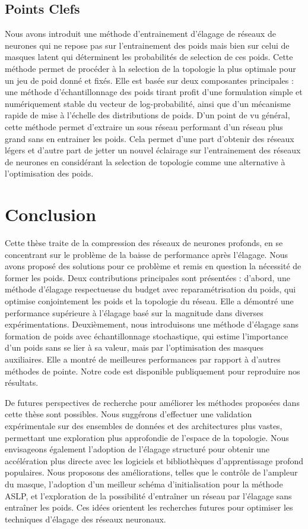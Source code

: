 \subsection*{Points Clefs}

Nous avons introduit une méthode d'entrainement d'élagage de réseaux de neurones
qui ne repose pas sur l'entrainement des poids mais bien sur celui de masques
latent qui déterminent les probabilités de selection de ces poids. Cette méthode
permet de procéder à la selection de la topologie la plus optimale pour un jeu
de poid donné et fixés. Elle est basée sur deux composantes principales : une
méthode d'échantillonnage des poids tirant profit d'une formulation simple et
numériquement stable du vecteur de log-probabilité, ainsi que d'un mécanisme
rapide de mise à l'échelle des distributions de poids. D'un point de vu général,
cette méthode permet d'extraire un sous réseau performant d'un réseau plus grand
sans en entrainer les poids. Cela permet d'une part d'obtenir des réseaux légers
et d'autre part de jetter un nouvel éclairage sur l'entrainement des réseaux de
neurones en considérant la selection de topologie comme une alternative à
l'optimisation des poids.\\

\section*{Conclusion}

Cette thèse traite de la compression des réseaux de neurones profonds, en se
concentrant sur le problème de la baisse de performance après l'élagage. Nous
avons proposé des solutions pour ce problème et remis en question la nécessité
de former les poids. Deux contributions principales sont présentées : d'abord,
une méthode d'élagage respectueuse du budget avec reparamétrisation du poids,
qui optimise conjointement les poids et la topologie du réseau. Elle a démontré
une performance supérieure à l'élagage basé sur la magnitude dans diverses
expérimentations. Deuxièmement, nous introduisons une méthode d'élagage sans
formation de poids avec échantillonnage stochastique, qui estime l'importance
d'un poids sans se lier à sa valeur, mais par l'optimisation des masques
auxiliaires. Elle a montré de meilleures performances par rapport à d'autres
méthodes de pointe. Notre code est disponible publiquement pour reproduire nos
résultats.

De futures perspectives de recherche pour améliorer les méthodes proposées dans
cette thèse sont possibles.  Nous suggérons d'effectuer une validation
expérimentale sur des ensembles de données et des architectures plus vastes,
permettant une exploration plus approfondie de l'espace de la topologie. Nous
envisageons également l'adoption de l'élagage structuré pour obtenir une
accélération plus directe avec les logiciels et bibliothèques d'apprentissage
profond populaires. Nous proposons des améliorations, telles que le contrôle de
l'ampleur du masque, l'adoption d'un meilleur schéma d'initialisation pour la
méthode \ac{ASLP}, et l'exploration de la possibilité d'entraîner un réseau par
l'élagage sans entraîner les poids. Ces idées orientent les recherches futures
pour optimiser les techniques d'élagage des réseaux neuronaux.



